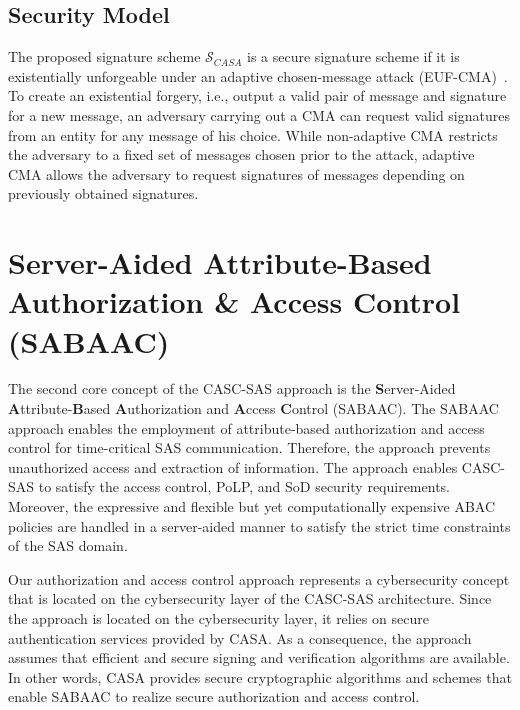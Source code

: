 \subsection{Security Model}
The proposed signature scheme $\mathcal{S}_{CASA}$ is a secure signature scheme if it is existentially unforgeable under an adaptive chosen-message attack (EUF-CMA)~\cite{Boneh2023, Goldwasser1988}.
To create an existential forgery, i.e., output a valid pair of message and signature for a new message, an adversary carrying out a CMA can request valid signatures from an entity for any message of his choice.
While non-adaptive CMA restricts the adversary to a fixed set of messages chosen prior to the attack, adaptive CMA allows the adversary to request signatures of messages depending on previously obtained signatures.

\section{Server-Aided Attribute-Based Authorization \& Access Control (SABAAC)}
\label{sec:approach:sabaac}
The second core concept of the CASC-SAS approach is the \textbf{S}erver-Aided \textbf{A}ttribute-\textbf{B}ased \textbf{A}uthorization and \textbf{A}ccess \textbf{C}ontrol (SABAAC).
The SABAAC approach enables the employment of attribute-based authorization and access control for time-critical SAS communication.
Therefore, the approach prevents unauthorized access and extraction of information.
The approach enables CASC-SAS to satisfy the access control, PoLP, and SoD security requirements.
Moreover, the expressive and flexible but yet computationally expensive ABAC policies are handled in a server-aided manner to satisfy the strict time constraints of the SAS domain.

Our authorization and access control approach represents a cybersecurity concept that is located on the cybersecurity layer of the CASC-SAS architecture.
Since the approach is located on the cybersecurity layer, it relies on secure authentication services provided by CASA.
As a consequence, the approach assumes that efficient and secure signing and verification algorithms are available.
In other words, CASA provides secure cryptographic algorithms and schemes that enable SABAAC to realize secure authorization and access control.

